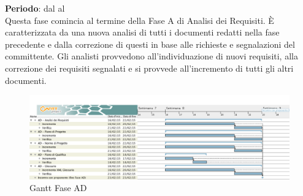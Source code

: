 \textbf{Periodo}: dal  al  \\
Questa fase comincia al termine della Fase A di Analisi dei Requisiti. È caratterizzata da una nuova analisi di tutti i documenti redatti nella fase precedente e dalla correzione di questi in base alle richieste e segnalazioni del committente. Gli analisti provvedono all'individuazione di nuovi requisiti, alla correzione dei requisiti segnalati e si provvede all'incremento di tutti gli altri documenti.
\begin{center}
	\begin{figure}[H]\centering
		\includegraphics[width=\textwidth]{PianoDiProgetto/Pics/FaseAD.png}
		\caption{Gantt Fase AD}
	\end{figure}
\end{center}
